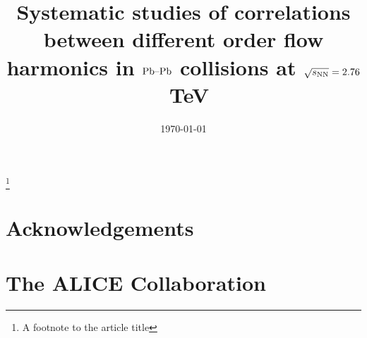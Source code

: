 \documentclass[twocolumn,letterpaper,aps,prc,longbibliography,superscriptaddress,showpacs,nofootinbib,floatfix]{revtex4-1}
\newcommand{\PbPb}{\textnormal{Pb--Pb}}
\newcommand{\tn}[1]{\textnormal{#1}}
\newcommand{\snn}{\ensuremath{\sqrt{s_\tn{NN}}}}
\begin{document}

\title{Systematic studies of correlations between different order flow harmonics in $\PbPb$ collisions at $\snn = 2.76$~TeV}%
\thanks{A footnote to the article title}%



\date{\today}%

\begin{abstract}

\end{abstract}

\maketitle



\newenvironment{acknowledgement}{\relax}{\relax}
\begin{acknowledgement}
\section*{Acknowledgements}
\end{acknowledgement}
%
%
%
%

% 
%
%



\newpage
%
%
\appendix
\section{The ALICE Collaboration}
\label{app:collab}
%
\end{document}
